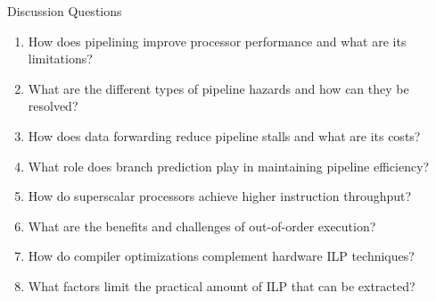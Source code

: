 \begin{frame}{Discussion Questions}
\begin{enumerate}
\item How does pipelining improve processor performance and what are its limitations?
\item What are the different types of pipeline hazards and how can they be resolved?
\item How does data forwarding reduce pipeline stalls and what are its costs?
\item What role does branch prediction play in maintaining pipeline efficiency?
\item How do superscalar processors achieve higher instruction throughput?
\item What are the benefits and challenges of out-of-order execution?
\item How do compiler optimizations complement hardware ILP techniques?
\item What factors limit the practical amount of ILP that can be extracted?
\end{enumerate}
\end{frame}


